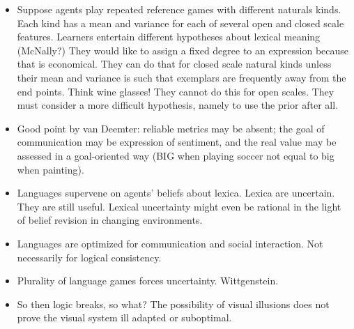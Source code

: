 \documentclass[fleqn,reqno,10pt]{article}
\begin{document}
\begin{itemize}
\item   Suppose agents play repeated reference games with different naturals kinds. Each kind has a
  mean and variance for each of several open and closed scale features. Learners entertain
  different hypotheses about lexical meaning (McNally?) They would like to assign a fixed
  degree to an expression because that is economical. They can do that for closed scale natural
  kinds unless their mean and variance is such that exemplars are frequently away from the end
  points. Think wine glasses! They cannot do this for open scales. They must consider a more
  difficult hypothesis, namely to use the prior after all.

\item   Good point by van Deemter: reliable metrics may be absent; the goal of communication may be
  expression of sentiment, and the real value may be assessed in a goal-oriented way (BIG when
  playing soccer not equal to big when painting).

\item   Languages supervene on agents' beliefs about lexica. Lexica are uncertain. They are still
  useful. Lexical uncertainty might even be rational in the light of belief revision in
  changing environments.

\item   Languages are optimized for communication and social interaction. Not necessarily for logical
  consistency.

\item   Plurality of language games forces uncertainty. Wittgenstein.

\item   So then logic breaks, so what? The possibility of visual illusions does not prove the visual
  system ill adapted or suboptimal.
\end{itemize}
\end{document}
